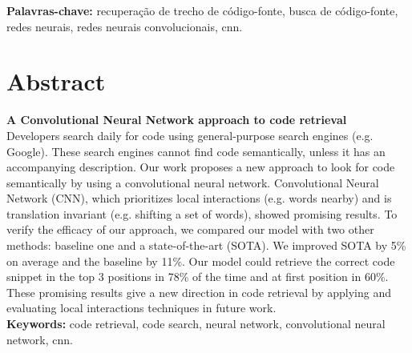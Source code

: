 \documentclass[12pt,twoside,a4paper]{book} %
\begin{document}
\noindent \textbf{Palavras-chave:} recuperação de trecho de código-fonte, busca de código-fonte, redes neurais, redes neurais convolucionais, cnn.

\chapter*{Abstract}
\noindent \textbf{A Convolutional Neural Network approach to code retrieval}
\\

Developers search daily for code using general-purpose search engines (e.g. Google). These search engines cannot find code semantically, unless it has an accompanying description. Our work proposes a new approach to look for code semantically by using a convolutional neural network. Convolutional Neural Network (CNN), which prioritizes local interactions (e.g. words nearby) and is translation invariant (e.g. shifting a set of words), showed promising results. To verify the efficacy of our approach, we compared our model with two other methods: baseline one and a state-of-the-art (SOTA). We improved SOTA by 5\% on average and the baseline by 11\%. Our model could retrieve the correct code snippet in the top 3 positions in 78\% of the time and at first position in 60\%. These promising results give a new direction in code retrieval by applying and evaluating local interactions techniques in future work.
\\

\noindent \textbf{Keywords:} code retrieval, code search, neural network, convolutional neural network, cnn.

\tableofcontents    %


\end{document}

